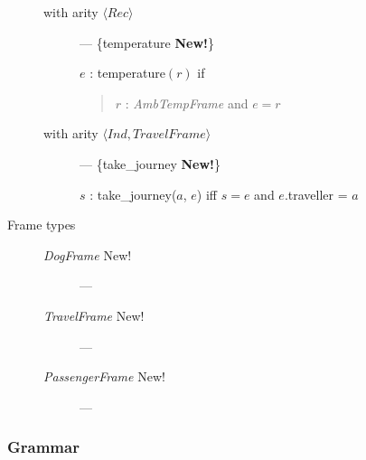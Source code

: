 \begin{description}
\begin{description}
  

  
\item[with arity \textnormal{$\langle\textit{Rec}\rangle$}] ---
  \{temperature \textbf{New!}\}
  
$e$ : temperature$(r)$ if 
  \begin{quote}
    $r$ : \textit{AmbTempFrame} and $e=r$
  \end{quote}

  
\item[with arity
  \textnormal{$\langle\textit{Ind},\textit{TravelFrame}\rangle$}] ---
  \{take\_journey \textbf{New!}\}

  $s$ : take\_journey($a$, $e$) iff $s=e$ and $e$.traveller = $a$
 
\end{description}

\item[Frame types] \mbox{}

  \begin{description}

    
  \item[\textnormal{\textit{DogFrame}} New!] ---
                    
  \item[\textnormal{\textit{TravelFrame}} New!] ---

    
  \item[\textnormal{\textit{PassengerFrame}} New!] ---


  \end{description}
  
  

\end{description}

\subsubsection{Grammar} 

